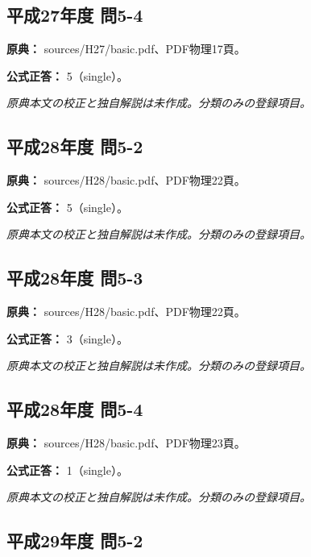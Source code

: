 \subsection{平成27年度 問5-4}
\label{q:h27-reg-basic-5-4}

\noindent\textbf{原典：} sources/H27/basic.pdf、PDF物理17頁。

\textbf{公式正答：} 5（single）。

\par\textit{原典本文の校正と独自解説は未作成。分類のみの登録項目。}

\subsection{平成28年度 問5-2}
\label{q:h28-reg-basic-5-2}

\noindent\textbf{原典：} sources/H28/basic.pdf、PDF物理22頁。

\textbf{公式正答：} 5（single）。

\par\textit{原典本文の校正と独自解説は未作成。分類のみの登録項目。}

\subsection{平成28年度 問5-3}
\label{q:h28-reg-basic-5-3}

\noindent\textbf{原典：} sources/H28/basic.pdf、PDF物理22頁。

\textbf{公式正答：} 3（single）。

\par\textit{原典本文の校正と独自解説は未作成。分類のみの登録項目。}

\subsection{平成28年度 問5-4}
\label{q:h28-reg-basic-5-4}

\noindent\textbf{原典：} sources/H28/basic.pdf、PDF物理23頁。

\textbf{公式正答：} 1（single）。

\par\textit{原典本文の校正と独自解説は未作成。分類のみの登録項目。}

\subsection{平成29年度 問5-2}
\label{q:h29-reg-basic-5-2}

